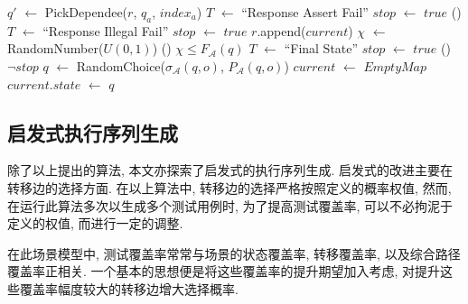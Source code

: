 \begin{algorithm}
{{{{{                                    
                                    $q'$ $\gets$ PickDependee($r$, $q_a$, $index_a$)\;
                                     {
                                    	$T$ $\gets$ ``Response Assert Fail''\;
                                        $stop$ $\gets$ $true$\;
                                    }
                                } \Else() {
                                	 {
                                    	$T$ $\gets$ ``Response Illegal Fail''\;
                                        $stop$ $\gets$ $true$\;
                                    }
                                }
                            }
                        }
                    }
                    $r$.append($current$)\;
                     {
                    	$\chi$ $\gets$ RandomNumber($U(0,1)$)\;
                        \If() {$\chi \le F_{\mathcal{A}}(q)$} {
                        	$T$ $\gets$ ``Final State''\;
                            $stop$ $\gets$ $true$\;
                        }
                    }
                	\If() {$\neg stop$} {
                    	$q$ $\gets$ RandomChoice($\sigma_{\mathcal{A}}(q,o)$, $P_{\mathcal{A}}(q,o)$)\;
                        $current$ $\gets$ $EmptyMap$\;
                        $current.state$ $\gets$ $q$\;
                    }
                }
    
                \label{algo:seqgen}
              \end{algorithm}
        
        \subsection{启发式执行序列生成}
            除了以上提出的算法, 本文亦探索了启发式的执行序列生成. 启发式的改进主要在转移边的选择方面. 在以上算法中, 转移边的选择严格按照定义的概率权值, 然而, 在运行此算法多次以生成多个测试用例时, 为了提高测试覆盖率, 可以不必拘泥于定义的权值, 而进行一定的调整.
            
            在此场景模型中, 测试覆盖率常常与场景的状态覆盖率, 转移覆盖率, 以及综合路径覆盖率正相关. 一个基本的思想便是将这些覆盖率的提升期望加入考虑, 对提升这些覆盖率幅度较大的转移边增大选择概率.
            
